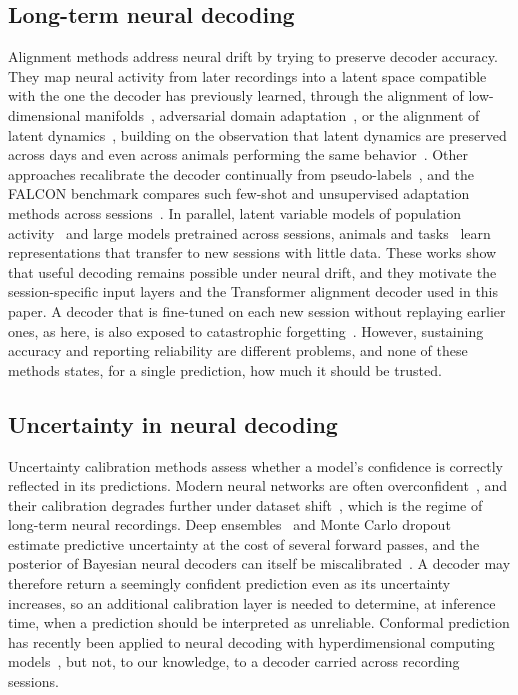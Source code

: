 \documentclass{article}
\begin{document}
\subsection{Long-term neural decoding}
Alignment methods address neural drift by trying to preserve decoder accuracy. They map neural activity from later recordings into a latent space compatible with the one the decoder has previously learned, through the alignment of low-dimensional manifolds~\cite{degenhart2020a}, adversarial domain adaptation~\cite{farshchian2019,ma2023,jude2022}, or the alignment of latent dynamics~\cite{karpowicz2025a}, building on the observation that latent dynamics are preserved across days and even across animals performing the same behavior~\cite{safaie2023}. Other approaches recalibrate the decoder continually from pseudo-labels~\cite{fan2023a}, and the FALCON benchmark compares such few-shot and unsupervised adaptation methods across sessions~\cite{karpowicz2024a}. In parallel, latent variable models of population activity~\cite{pandarinath2018a,keshtkaran2022} and large models pretrained across sessions, animals and tasks~\cite{schneider2023a,azabou2023,azabou2025,ye2023,zhang2024,zhang2025} learn representations that transfer to new sessions with little data. These works show that useful decoding remains possible under neural drift, and they motivate the session-specific input layers and the Transformer alignment decoder used in this paper. A decoder that is fine-tuned on each new session without replaying earlier ones, as here, is also exposed to catastrophic forgetting~\cite{kirkpatrick2017}. However, sustaining accuracy and reporting reliability are different problems, and none of these methods states, for a single prediction, how much it should be trusted.

\subsection{Uncertainty in neural decoding}
Uncertainty calibration methods assess whether a model's confidence is correctly reflected in its predictions. Modern neural networks are often overconfident~\cite{guo2017a}, and their calibration degrades further under dataset shift~\cite{ovadia2019a}, which is the regime of long-term neural recordings. Deep ensembles~\cite{lakshminarayanan2017a} and Monte Carlo dropout~\cite{gal2016} estimate predictive uncertainty at the cost of several forward passes, and the posterior of Bayesian neural decoders can itself be miscalibrated~\cite{weiWeiGanChao2024}. A decoder may therefore return a seemingly confident prediction even as its uncertainty increases, so an additional calibration layer is needed to determine, at inference time, when a prediction should be interpreted as unreliable. Conformal prediction has recently been applied to neural decoding with hyperdimensional computing models~\cite{liang2026a}, but not, to our knowledge, to a decoder carried across recording sessions.
\end{document}
